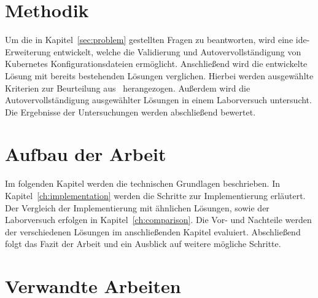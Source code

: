 \section{Methodik}
Um die in Kapitel~\ref{sec:problem} gestellten Fragen zu beantworten, wird eine \acs{ide}-Erweiterung entwickelt, welche die Validierung und Autovervollständigung von
Kubernetes Konfigurationsdateien ermöglicht. Anschließend wird die entwickelte Lösung mit bereits bestehenden Lösungen verglichen.
Hierbei werden ausgewählte Kriterien zur Beurteilung aus~\cite[A Large-Scale Study of Usability Criteria Addressed by Static Analysis Tools]{usability-criteria-static-analysis-tools} herangezogen.
Außerdem wird die Autovervollständigung ausgewählter Lösungen in einem Laborversuch untersucht.
Die Ergebnisse der Untersuchungen werden abschließend bewertet.

\section{Aufbau der Arbeit}
Im folgenden Kapitel werden die technischen Grundlagen beschrieben. In Kapitel~\ref{ch:implementation} werden die Schritte zur Implementierung erläutert.
Der Vergleich der Implementierung mit ähnlichen Lösungen, sowie der Laborversuch erfolgen in Kapitel~\ref{ch:comparison}.
Die Vor- und Nachteile werden der verschiedenen Lösungen im anschließenden Kapitel evaluiert.
Abschließend folgt das Fazit der Arbeit und ein Ausblick auf weitere mögliche Schritte.

\section{Verwandte Arbeiten}

